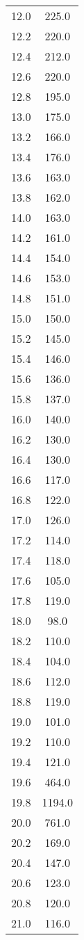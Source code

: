 \begin{table}
\begin{tabular}{S S }
12.0  & 225.0\\ 
12.2  & 220.0\\ 
12.4  & 212.0\\ 
12.6  & 220.0\\ 
12.8  & 195.0\\ 
13.0  & 175.0\\ 
13.2  & 166.0\\ 
13.4  & 176.0\\ 
13.6  & 163.0\\ 
13.8  & 162.0\\ 
14.0  & 163.0\\ 
14.2  & 161.0\\ 
14.4  & 154.0\\ 
14.6  & 153.0\\ 
14.8  & 151.0\\ 
15.0  & 150.0\\ 
15.2  & 145.0\\ 
15.4  & 146.0\\ 
15.6  & 136.0\\ 
15.8  & 137.0\\ 
16.0  & 140.0\\ 
16.2  & 130.0\\ 
16.4  & 130.0\\ 
16.6  & 117.0\\ 
16.8  & 122.0\\ 
17.0  & 126.0\\ 
17.2  & 114.0\\ 
17.4  & 118.0\\ 
17.6  & 105.0\\ 
17.8  & 119.0\\ 
18.0  & 98.0\\ 
18.2  & 110.0\\ 
18.4  & 104.0\\ 
18.6  & 112.0\\ 
18.8  & 119.0\\ 
19.0  & 101.0\\ 
19.2  & 110.0\\ 
19.4  & 121.0\\ 
19.6  & 464.0\\ 
19.8  & 1194.0\\ 
20.0  & 761.0\\ 
20.2  & 169.0\\ 
20.4  & 147.0\\ 
20.6  & 123.0\\ 
20.8  & 120.0\\ 
21.0  & 116.0\\ 

\end{tabular}
\end{table}
